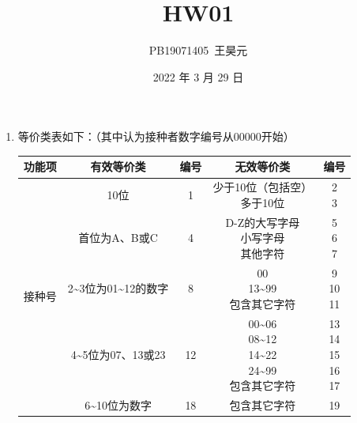 \documentclass{article}
\title{HW01}
\author{PB19071405\ 王昊元}
\date{2022 年 3 月 29 日}
\begin{document}
    \pagestyle{empty}
    \maketitle
    \thispagestyle{empty}

    \begin{enumerate}[label=\arabic*.]
        \item 等价类表如下：（其中认为接种者数字编号从00000开始）\\
        \scalebox{1}
        {
            \begin{tabular}{|c|c|c|c|c|}
                \hline
                功能项 & 有效等价类 & 编号 & 无效等价类 & 编号 \\
                \hline
                \multirow{5}{*}{接种号} & 10位 & 1 & \makecell[c]{少于10位（包括空） \\ 多于10位} & \makecell[c]{2 \\ 3} \\
                \cline{2-5}
                ~ & 首位为A、B或C & 4 & \makecell[c]{D-Z的大写字母 \\ 小写字母 \\ 其他字符} & \makecell[c]{5 \\ 6 \\ 7} \\
                \cline{2-5}
                ~ & 2\textasciitilde 3位为01\textasciitilde 12的数字 & 8 & \makecell[c]{00 \\ 13\textasciitilde 99 \\ 包含其它字符} & \makecell[c]{9 \\ 10 \\ 11} \\
                \cline{2-5}
                ~ & 4\textasciitilde 5位为07、13或23 & 12 & \makecell[c]{00\textasciitilde 06 \\ 08\textasciitilde 12 \\ 14\textasciitilde 22 \\ 24\textasciitilde 99 \\ 包含其它字符} & \makecell[c]{13 \\ 14 \\ 15 \\ 16 \\ 17} \\
                \cline{2-5}
                ~ & 6\textasciitilde 10位为数字 & 18 & 包含其它字符 & 19 \\
                \hline
            \end{tabular}
        }


\end{enumerate}
\end{document}
